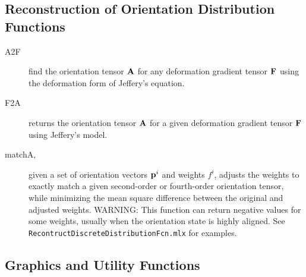 \documentclass[11pt]{article}
\begin{document}
\subsection{Reconstruction of Orientation Distribution Functions}

\begin{description}

    \item[A2F]{find the orientation tensor $\mathbf{A}$ for any deformation gradient tensor $\mathbf{F}$ using the deformation form of Jeffery's equation.}
    
    \item[F2A]{returns the orientation tensor $\mathbf{A}$ for a given deformation gradient tensor $\mathbf{F}$ using Jeffery's model.}
    
    \item[matchA,]{given a set of orientation vectors $\mathbf{p}^i$ and weights $f^i$, adjusts the weights to exactly match a given second-order or fourth-order orientation tensor, while minimizing the mean square difference between the original and adjusted weights.  WARNING: This function can return negative values for some weights, usually when the orientation state is highly aligned.  See \texttt{RecontructDiscreteDistributionFcn.mlx} for examples.}    
    
\end{description}

\subsection{Graphics and Utility Functions}
\end{document}
